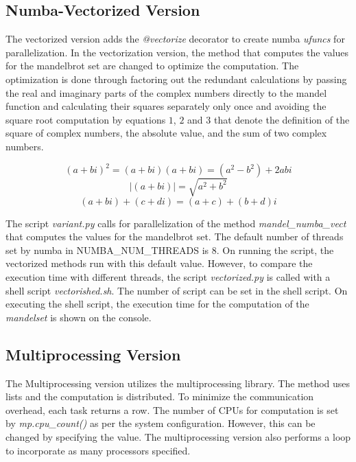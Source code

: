 \documentclass{article}
\begin{document}
\subsection{Numba-Vectorized Version}
The vectorized version adds the \textit{@vectorize} decorator to create numba \textit{ufuncs} for parallelization. In the vectorization version, the method that computes the values for the mandelbrot set are changed to optimize the computation. The optimization is done through factoring out the redundant calculations by passing the real and imaginary parts of the complex numbers directly to the mandel function and calculating their squares separately only once and avoiding the square root computation by equations $1$, $2$ and $3$ that denote the definition of the square of complex numbers, the absolute value, and the sum of two complex numbers.

\begin{equation}
    (a+bi)^2=(a+bi)(a+bi)=(a^2-b^2)+2abi
   \end{equation}
\begin{equation}
    \left |(a+bi) \right |= \sqrt{a^2+b^2}
\end{equation}
\begin{equation}
       (a+bi)+(c+di)=(a+c)+(b+d)i
\end{equation}

The script \textit{variant.py} calls for parallelization of the method \textit{mandel\_numba\_vect} that computes the values for the mandelbrot set. The default number of threads set by numba in NUMBA\_NUM\_THREADS is $8$. On running the script, the vectorized methods run with this default value. However, to compare the execution time with different threads, the script \textit{vectorized.py} is called with a shell script \textit{vectorished.sh}. The number of script can be set in the shell script.  On executing the shell script, the execution time for the computation of the \textit{mandelset} is shown on the console. 


\subsection{Multiprocessing Version}
The Multiprocessing version utilizes the multiprocessing library. The method uses lists and the computation is distributed. To minimize the communication overhead, each task returns a row. The number of CPUs for computation is set by \textit{mp.cpu\_count()} as per the system configuration. However, this can be changed by specifying the value. The multiprocessing version also performs a loop to incorporate as many processors specified. 
\end{document}

